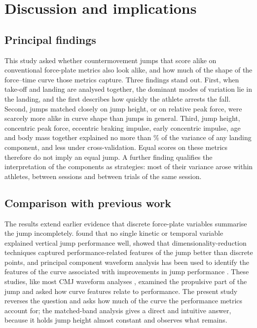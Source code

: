 


\section{Discussion and implications}

\subsection{Principal findings}

This study asked whether countermovement jumps that score alike on conventional force-plate metrics also look alike, and how much of the shape of the force--time curve those metrics capture. Three findings stand out. First, when take-off and landing are analysed together, the dominant modes of variation lie in the landing, and the first describes how quickly the athlete arrests the fall. Second, jumps matched closely on jump height, or on relative peak force, were scarcely more alike in curve shape than jumps in general. Third, jump height, concentric peak force, eccentric braking impulse, early concentric impulse, age and body mass together explained no more than \rtwoPCC\% of the variance of any landing component, and less under cross-validation. Equal scores on these metrics therefore do not imply an equal jump. A further finding qualifies the interpretation of the components as strategies: most of their variance arose within athletes, between sessions and between trials of the same session.

\subsection{Comparison with previous work}

The results extend earlier evidence that discrete force-plate variables summarise the jump incompletely. \citet{dowling1993} found that no single kinetic or temporal variable explained vertical jump performance well, \citet{richter2014b} showed that dimensionality-reduction techniques captured performance-related features of the jump better than discrete points, and principal component waveform analysis has been used to identify the features of the curve associated with improvements in jump performance \citep{floria2019}. These studies, like most CMJ waveform analyses \citep{cormie2009,sole2018,harry2018}, examined the propulsive part of the jump and asked how curve features relate to performance. The present study reverses the question and asks how much of the curve the performance metrics account for; the matched-band analysis gives a direct and intuitive answer, because it holds jump height almost constant and observes what remains.

